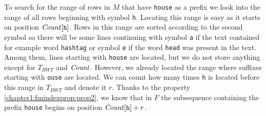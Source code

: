 To search for the range of rows in $M$ that have {\tt house} as a prefix we look into the range of all
rows beginning with symbol {\tt h}. Locating this range is easy as it starts on position
$\mathit{Count}[\texttt{h}]$. Rows in this range are sorted according to the second symbol so there will be
some lines continuing with symbol {\tt a} if the text contained for example word {\tt hashtag} or symbol
{\tt e} if the word {\tt head} was present in the text. Among them, lines starting with {\tt house} are
located, but we do not store anything except for $T_{BWT}$ and $\mathit{Count}$. However, we already located the
range where suffixes starting with {\tt ouse} are located. We can count how many times {\tt h} is located
before this range in $T_{BWT}$ and denote it $r$. Thanks to the property \ref{chapter1:fmindexprop:prop2},
we know that in $F$ the subsequence containing the prefix {\tt house} begins on position $\mathit{Count}[\texttt{h}]+r$.

